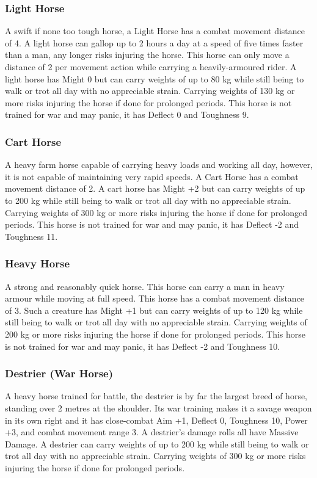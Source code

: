\subsubsection*{Light Horse}
A swift if none too tough horse, a Light Horse has a combat movement distance of 4. A light horse can gallop up to 2 hours a day at a speed of five times faster than a man, any longer risks injuring the horse. This horse can only move a distance of 2 per movement action while carrying a heavily-armoured rider. A light horse has Might 0 but can carry weights of up to 80 kg while still being to walk or trot all day with no appreciable strain. Carrying weights of 130 kg or more risks injuring the horse if done for prolonged periods. This horse is not trained for war and may panic, it has Deflect 0 and Toughness 9.

\subsubsection*{Cart Horse}
A heavy farm horse capable of carrying heavy loads and working all day, however, it is not capable of maintaining very rapid speeds. A Cart Horse has a combat movement distance of 2. A cart horse has Might +2 but can carry weights of up to 200 kg while still being to walk or trot all day with no appreciable strain. Carrying weights of 300 kg or more risks injuring the horse if done for prolonged periods. This horse is not trained for war and may panic, it has Deflect -2 and Toughness 11.

\subsubsection*{Heavy Horse}
A strong and reasonably quick horse. This horse can carry a man in heavy armour while moving at full speed. This horse has a combat movement distance of 3. Such a creature has Might +1 but can carry weights of up to 120 kg while still being to walk or trot all day with no appreciable strain. Carrying weights of 200 kg or more risks injuring the horse if done for prolonged periods. This horse is not trained for war and may panic, it has Deflect -2 and Toughness 10.

\subsubsection*{Destrier (War Horse)}
A heavy horse trained for battle, the destrier is by far the largest breed of horse, standing over 2 metres at the shoulder. Its war training makes it a savage weapon in its own right and it has close-combat Aim +1, Deflect 0, Toughness 10, Power +3, and combat movement range 3. A destrier's damage rolls all have Massive Damage. A destrier can carry weights of up to 200 kg while still being to walk or trot all day with no appreciable strain. Carrying weights of 300 kg or more risks injuring the horse if done for prolonged periods.

